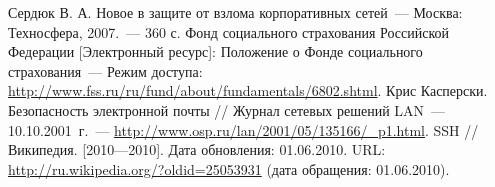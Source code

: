 \documentclass[russian, utf8, pointsubsection, floatsubsection,
equationsection, emptystyle, simple]{eskdtext}
\begin{document}


\tableofcontents
\newpage





\begin{thebibliography}{99}
 Сердюк В. А. Новое в защите от взлома корпоративных
  сетей~--- Москва: Техносфера, 2007.~--- 360 с.
Фонд социального страхования Российской Федерации
  [Электронный ресурс]: Положение о Фонде социального страхования~---
  Режим доступа:
  \url{http://www.fss.ru/ru/fund/about/fundamentals/6802.shtml}. 
 Крис Касперски. Безопасность электронной почты // Журнал
  сетевых решений LAN~--- 10.10.2001~г.~---
  \url{http://www.osp.ru/lan/2001/05/135166/_p1.html}.
 SSH // Википедия. [2010—2010]. Дата обновления:
  01.06.2010. URL: \url{http://ru.wikipedia.org/?oldid=25053931} (дата
  обращения: 01.06.2010).
\end{thebibliography}



\end{document}

